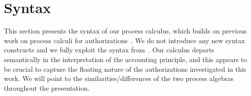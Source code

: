 \section{Syntax}\label{sec:Calculus}
This section presents the syntax of our process calculus, which builds on previous work on process calculi for authorizations~\cite{DBLP:journals/corr/GhilezanJPPV16,clar:eke}.
We do not introduce any new syntax constructs and we fully exploit the syntax from~\cite{DBLP:journals/corr/GhilezanJPPV16}. Our calculus departs semantically in the interpretation of the accounting principle, and this appears to be crucial to capture the floating nature of the authorizations investigated in this work. We will point to the similarities/differences of the two process algebras throughout the presentation.
 



